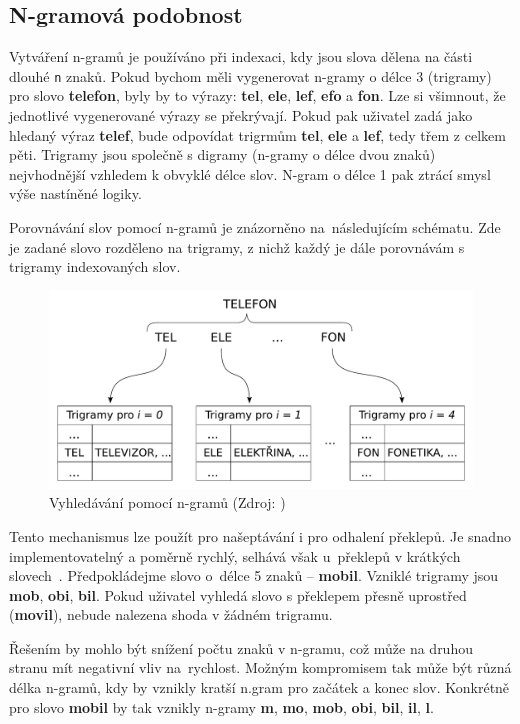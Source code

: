 \documentclass[FM,DP]{tulthesis}
\begin{document}
\subsection{N-gramová podobnost}

Vytváření n-gramů je používáno při indexaci, kdy jsou slova dělena na části dlouhé \verb|n| znaků.
Pokud bychom měli vygenerovat n-gramy o délce 3 (trigramy) pro slovo \textbf{telefon}, byly by 
to výrazy: \textbf{tel}, \textbf{ele}, \textbf{lef}, \textbf{efo} a \textbf{fon}. Lze si 
všimnout, že jednotlivé vygenerované výrazy se překrývají. Pokud pak uživatel zadá jako hledaný 
výraz \textbf{telef}, bude odpovídat trigrmům \textbf{tel}, \textbf{ele} a \textbf{lef}, 
tedy třem z celkem pěti. Trigramy jsou společně s digramy (n-gramy o délce dvou znaků) nejvhodnější
vzhledem k obvyklé délce slov. N-gram o délce 1 pak ztrácí smysl výše nastíněné logiky.

Porovnávání slov pomocí n-gramů je znázorněno na~následujícím schématu. Zde je zadané slovo
rozděleno na trigramy, z nichž každý je dále porovnávám s trigramy indexovaných slov.

\begin{figure}[h]
\center
\includegraphics[width=\textwidth]{n-gram.pdf}
\caption[Vyhledávání pomocí n-gramů]{Vyhledávání pomocí n-gramů (Zdroj: \cite{n-gram})}
\label{n-gram}
\end{figure}

Tento mechanismus lze použít pro našeptávání i pro odhalení překlepů. Je snadno implementovatelný
a poměrně rychlý, selhává však u~překlepů v krátkých slovech~\cite{n-gram}. Předpokládejme slovo 
o~délce 5 znaků -- \textbf{mobil}. Vzniklé trigramy jsou \textbf{mob}, \textbf{obi}, \textbf{bil}.
Pokud uživatel vyhledá slovo s překlepem přesně uprostřed (\textbf{movil}), nebude nalezena
shoda v žádném trigramu. 

Řešením by mohlo být snížení počtu znaků v n-gramu, což může na druhou stranu mít negativní 
vliv na~rychlost. Možným kompromisem tak může být různá délka n-gramů, kdy by vznikly kratší
n.gram pro začátek a konec slov. Konkrétně pro slovo \textbf{mobil} by tak vznikly n-gramy 
\textbf{m}, \textbf{mo}, \textbf{mob}, \textbf{obi}, \textbf{bil}, \textbf{il}, \textbf{l}.
\end{document}
